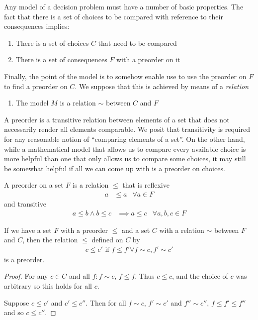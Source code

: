 Any model of a decision problem must have a number of basic properties. The fact that there is a set of choices to be compared with reference to their consequences implies:
\begin{enumerate}
    \item There is a set of choices $C$ that need to be compared
    \item There is a set of consequences $F$ with a preorder on it
\end{enumerate}
Finally, the point of the model is to somehow enable use to use the preorder on $F$ to find a preorder on $C$. We suppose that this is achieved by means of a \emph{relation}
\begin{enumerate}
    \setcounter{enumitem}{2}
    \item The model $M$ is a relation $\sim$ between $C$ and $F$
\end{enumerate}

A preorder is a transitive relation between elements of a set that does not necessarily render all elements comparable. We posit that transitivity is required for any reasonable notion of ``comparing elements of a set''. On the other hand, while a mathematical model that allows us to compare every available choice is more helpful than one that only allows us to compare some choices, it may still be somewhat helpful if all we can come up with is a preorder on choices.

\begin{definition}[Preorder]
A preorder on a set $F$ is a relation $\leq$ that is reflexive
\begin{align}
    a&\leq a &\forall a\in F
\end{align}
and transitive
\begin{align}
    a\leq b \land b\leq c &\implies a\leq c & \forall a,b,c\in F
\end{align}
\end{definition}


\begin{lemma}
If we have a set $F$ with a preorder $\leq$ and a set $C$ with a relation $\sim$ between $F$ and $C$, then the relation $\leqslant$ defined on $C$ by
\begin{align}
    c\leqslant c' \text{ if } f\leq f' \forall f\sim c, f'\sim c'
\end{align}
is a preorder.
\end{lemma}

\begin{proof}
For any $c\in C$ and all $f:f\sim c$, $f\leq f$. Thus $c\leq c$, and the choice of $c$ was arbitrary so this holds for all $c$.

Suppose $c\leqslant c'$ and $c'\leqslant c''$. Then for all $f\sim c$, $f'\sim c'$ and $f''\sim c''$, $f\leq f'\leq f''$ and so $c\leqslant c''$.
\end{proof}

